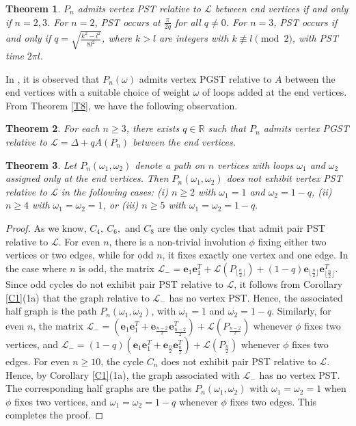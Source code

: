 \documentclass[12pt,a4paper]{article}
\newtheorem{thm}{Theorem}
\def \e {{\mathbf e}}
\begin{document}
\begin{thm}\label{T9}
$P_n$ admits vertex PST relative to $\mathscr{L}$ between end vertices if and only if $n =2,3$. For $n = 2$, PST occurs at $\frac{\pi}{2q}$ for all $q\neq 0$. For $n = 3$, PST occurs if and only if $q = \sqrt{\frac{k^2 - l^2}{8l^2}}$, where $k>l$ are integers with $k \not\equiv l \pmod{2}$, with PST time $ 2\pi l.$
\end{thm}
In \cite[Theorem 3]{kempton}, it is observed that $P_n(\omega)$ admits vertex PGST relative to $A$ between the end vertices with a suitable choice of weight $\omega$ of loops added at the end vertices. From Theorem \ref{T8}, we have the following observation.

\begin{thm}
\label{omega}
For each $n\geq 3$, there exists $q \in \mathbb{R}$ such that $P_n$ admits vertex PGST relative to $\mathscr{L}=\Delta+qA(P_n)$ between the end vertices.
\end{thm}

\begin{thm}\label{T10}
Let $P_n(\omega_1,\omega_2)$ denote a path on $n$ vertices with loops $\omega_1$ and $\omega_2$ assigned only at the end vertices. Then $P_n(\omega_1,\omega_2)$ does not exhibit vertex PST relative to $\mathscr{L}$ in the following cases: (i) $n \ge 2$ with $\omega_1=1$ and $\omega_2=1-q$, (ii) $n \geq 4$ with $\omega_1=\omega_2=1$, or (iii) $n \geq 5$ with $\omega_1=\omega_2=1-q.$
\end{thm}

\begin{proof}
As we know, $C_4,~C_6,$ and $C_8$ are the only cycles that admit pair PST relative to $\mathscr{L}$. For even $n$, there is a non-trivial involution $\phi$ fixing either two vertices or two edges, while for odd $n$, it fixes exactly one vertex and one edge. In the case where $n$ is odd, the matrix $\mathscr{L}_-=\e_1\e_1^T + \mathscr{L}(P_{\lfloor\frac{n}{2}\rfloor})+(1-q)\e_{\lfloor \frac{n}{2}\rfloor}\e_{\lfloor \frac{n}{2}\rfloor}^T$. Since odd cycles do not exhibit pair PST relative to $\mathscr{L}$, it follows from Corollary \ref{C1}(1a) that the graph relative to $\mathscr{L}_-$ has no vertex PST. Hence, the associated half graph is the path  $P_n(\omega_1,\omega_2)$, with $\omega_1=1$ and $\omega_2=1-q$. Similarly, for even $n$, the matrix $\mathscr{L}_-=(\e_1\e_1^T+\e_{\frac{n-2}{2}}\e_{\frac{n-2}{2}}^T)+\mathscr{L}(P_{\frac{n-2}{2}})$ whenever $\phi$ fixes two vertices, and $\mathscr{L}_-=(1-q)(\e_1\e_1^T+\e_{\frac{n}{2}}\e_{\frac{n}{2}}^T)+\mathscr{L}(P_{\frac{n}{2}})$ whenever $\phi$ fixes two edges. For even $n \ge 10$, the cycle $C_n$ does not exhibit pair PST relative to $\mathscr{L}$. Hence, by Corollary \ref{C1}(1a), the graph associated with $\mathscr{L}_-$ has no vertex PST. The corresponding half graphs are the paths $P_n(\omega_1,\omega_2)$ with $\omega_1=\omega_2=1$ when $\phi$ fixes two vertices, and $\omega_1=\omega_2=1-q$ whenever $\phi$ fixes two edges. This completes the proof.
\end{proof}
\end{document}
